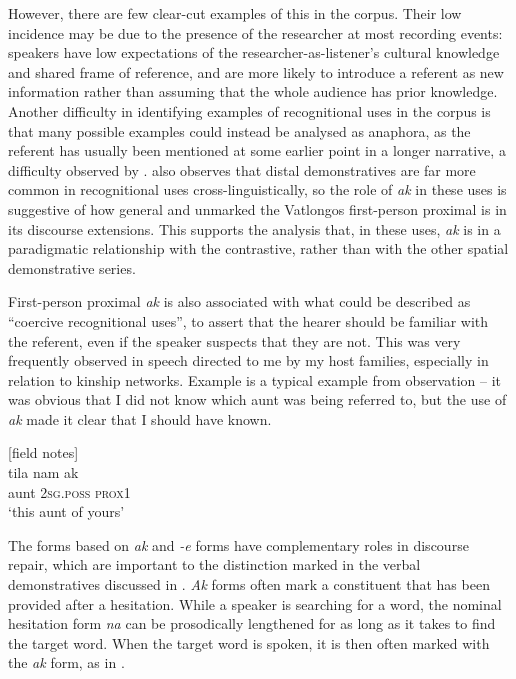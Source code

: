 \documentclass[output=paper,colorlinks,citecolor=brown]{langscibook}
\begin{document}
However, there are few clear-cut examples of this in the corpus. Their low incidence may be due to the presence of the researcher at most recording events: speakers have low expectations of the researcher-as-listener’s cultural knowledge and shared frame of reference, and are more likely to introduce a referent as new information rather than assuming that the whole audience has prior knowledge. Another difficulty in identifying examples of recognitional uses in the corpus is that many possible examples could instead be analysed as anaphora, as the referent has usually been mentioned at some earlier point in a longer narrative, a difficulty observed by \citet[236]{Himmelmann1996}. \citet[235]{Himmelmann1996} also observes that distal demonstratives are far more common in recognitional uses cross-linguistically, so the role of \textit{ak} in these uses is suggestive of how general and unmarked the Vatlongos first-person proximal is in its discourse extensions. This supports the analysis that, in these uses, \textit{ak} is in a paradigmatic relationship with the contrastive, rather than with the other spatial demonstrative series.

First-person proximal\textit{ ak} is also associated with what could be described as “coercive recognitional uses”, to assert that the hearer should be familiar with the referent, even if the speaker suspects that they are not. This was very frequently observed in speech directed to me by my host families, especially in relation to kinship networks. Example  is a typical example from observation – it was obvious that I did not know which aunt was being referred to, but the use of \textit{ak} made it clear that I should have known.

\ea
{\label{ex:ridge:42}[field notes]}\\
\gll tila  nam    ak\\
     aunt  \textsc{2sg.poss} \textsc{prox1}\\
\glt ‘this aunt of yours’
\z

The forms based on \textit{ak} and \textit{-e} forms have complementary roles in discourse repair, which are important to the distinction marked in the verbal demonstratives discussed in . \textit{Ak} forms often mark a constituent that has been provided after a hesitation. While a speaker is searching for a word, the nominal hesitation form \textit{na} can be prosodically lengthened for as long as it takes to find the target word. When the target word is spoken, it is then often marked with the \textit{ak} form, as in .
\end{document}
